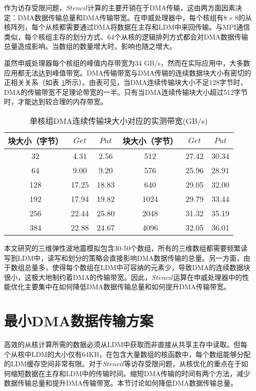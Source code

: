 作为访存受限问题，$Stencil$计算的主要开销在于DMA传输，这由两方面因素决定：DMA数据传输总量和DMA传输带宽。在申威处理器中，每个核组有$8\times8$的从核阵列，每个从核都需要通过DMA将数据在主存和LDM中来回传输。与MPI通信类似，每个核组主存的划分方式、64个从核的逻辑排列方式都会对DMA数据传输总量造成影响。当数组的数量增大时，影响也随之增大。


虽然申威处理器每个核组的峰值内存带宽为34 GB/s，然而在实际应用中，大多数应用都无法达到峰值带宽。DMA传输带宽与DMA传输的连续数据块大小有密切的正相关关系（如表
\ref{tb:sw-bw}所示）。由表可见，当DMA连续传输块大小不足128字节时，DMA的传输带宽不足理论带宽的一半。只有当DMA连续传输块大小超过512字节时，才能达到较合理的内存带宽。

\begin{table}[thb]
\caption{单核组DMA连续传输块大小对应的实测带宽(GB/s)}
\label{tb:sw-bw}
\centering
\begin{tabular}{|c|c|c||c|c|c|}
  \hline
  块大小（字节） & $Get$ & $Put$ & 块大小（字节） & $Get$ & $Put$ \\
  \hline
  32&4.31&2.56& 512&27.42&30.34\\
  \hline
  64&9.00&9.20& 576&25.96&28.91\\
  \hline
  128&17.25&18.83& 640&29.05&32.00\\
  \hline
  192&17.94&19.82& 1024&29.79&33.44\\
  \hline
  256&22.44&25.80& 2048&31.32&35.19\\
  \hline
  384&22.88&24.67& 4096&32.05&36.01\\
  \hline
\end{tabular}
\end{table}

本文研究的三维弹性波地震模拟包含30-50个数组，所有的三维数组都需要频繁读写到LDM中，读写和划分的策略会直接影响DMA数据传输的总量。另一方面，由于数组总量多，使得每个数组在LDM中可容纳的元素少，导致DMA的连续数据块很小，这极大地制约着DMA的传输带宽。因此，$Stencil$运算在申威处理器中的性能优化主要集中在如何降低DMA数据传输总量和如何提升DMA传输带宽。

\section{最小DMA数据传输方案} %
\label{sec:最小DMA数据传输方案}

高效的从核计算所需的数据必须从LDM中获取而非直接从共享主存中读取。但每个从核中LDM的大小仅有64KB，在包含大量数组的核函数中，每个数组能够分配的LDM缓存空间非常有限。对于$Stencil$等访存受限问题，从核优化的重点在于如何缩短数据在主存和LDM中的传输时间。缩短DMA传输的时间有两个方法，减少数据传输总量和提升DMA传输带宽。本节讨论如何降低DMA数据传输总量。

